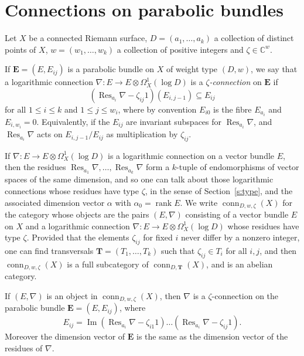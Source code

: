 \documentclass{amsart}
\theoremstyle{plain}
\theoremstyle{definition}
\theoremstyle{remark}
\newcommand{\C}{\mathbb{C}}
\DeclareMathOperator{\Ima}{Im}
\DeclareMathOperator{\rank}{rank}
\DeclareMathOperator{\Res}{Res}
\DeclareMathOperator{\conn}{conn}
\newcommand{\E}{\mathbf{E}}
\begin{document}
\section{Connections on parabolic bundles}
\label{s:Weil}
Let $X$ be a connected Riemann surface, $D=(a_1,\dots,a_k)$ a collection
of distinct points of $X$, $w=(w_1,\dots,w_k)$ a collection of positive integers
and $\zeta\in\C^w$.

If $\E = (E,E_{ij})$ is a parabolic bundle on $X$ of weight type $(D,w)$,
we say that a logarithmic connection
$\nabla : E \to E \otimes \Omega^1_X(\log D)$ is a \emph{$\zeta$-connection}
on $\E$ if
%
\begin{equation}
\label{parconcond}
(\Res_{a_i} \nabla - \zeta_{ij} 1)(E_{i,j-1}) \subseteq E_{ij}
\end{equation}
%
for all $1\le i\le k$ and $1\le j\le w_i$,
where by convention $E_{i0}$ is the fibre $E_{a_i}$ and $E_{i,w_i}=0$.
Equivalently, if the $E_{ij}$ are invariant subspaces for $\Res_{a_i} \nabla$,
and $\Res_{a_i} \nabla$ acts on $E_{i,j-1}/E_{ij}$ as multiplication by $\zeta_{ij}$.

If $\nabla : E \to E \otimes \Omega^1_X(\log D)$ is a logarithmic connection
on a vector bundle $E$, then the residues
$\Res_{a_1}\nabla,\dots,\Res_{a_k}\nabla$
form a $k$-tuple of endomorphisms of vector spaces of the same dimension,
and so one can talk about those logarithmic connections whose residues have
type $\zeta$, in the sense of Section~\ref{s:type}, and the associated dimension vector
$\alpha$ with $\alpha_0 = \rank E$.
We write $\conn_{D,w,\zeta}(X)$ for the category whose objects are the pairs
$(E,\nabla)$ consisting of a vector bundle $E$ on $X$ and a logarithmic connection
$\nabla:E\to E\otimes \Omega_X^1(\log D)$ whose residues have type $\zeta$.
Provided that the elements $\zeta_{ij}$ for fixed $i$ never differ
by a nonzero integer, one can find transversals $\mathbf{T} = (T_1,\dots,T_k)$ such
that $\zeta_{ij}\in T_i$ for all $i,j$, and then $\conn_{D,w,\zeta}(X)$ is a full subcategory
of $\conn_{D,\mathbf{T}}(X)$, and is an abelian category.

If $(E,\nabla)$ is an object in $\conn_{D,w,\zeta}(X)$, then $\nabla$ is
a $\zeta$-connection on the parabolic bundle $\E = (E,E_{ij})$, where
%
\begin{equation}
\label{e:zetaconform}
E_{ij} = \Ima(\Res_{a_i}\nabla - \zeta_{i1}1)\dots(\Res_{a_i}\nabla - \zeta_{ij}1).
\end{equation}
%
Moreover the dimension vector of $\E$ is the same as the dimension vector of the
residues of $\nabla$.
\end{document}
